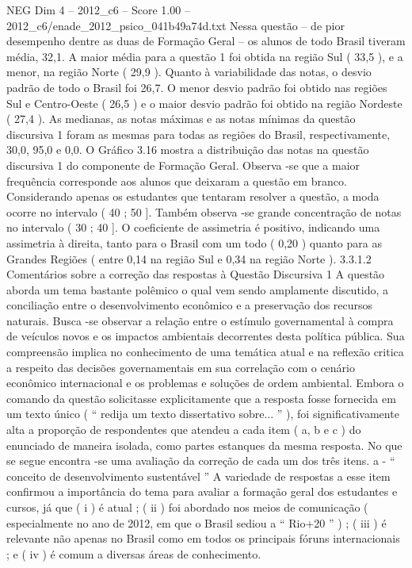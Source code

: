 \begin{textsample}{NEG Dim 4 – 2012\_c6 – Score 1.00 – 2012\_c6/enade\_2012\_psico\_041b49a74d.txt}
Nessa questão – de pior desempenho dentre as duas de Formação Geral – os alunos de todo Brasil tiveram média, 32,1.
A maior média para a questão 1 foi obtida na região Sul ( 33,5 ), e a menor, na região Norte ( 29,9 ).
Quanto à variabilidade das notas, o desvio padrão de todo o Brasil foi 26,7.
O menor desvio padrão foi obtido nas regiões Sul e Centro-Oeste ( 26,5 ) e o maior desvio padrão foi obtido na região Nordeste ( 27,4 ).
As medianas, as notas máximas e as notas mínimas da questão discursiva 1 foram as mesmas para todas as regiões do Brasil, respectivamente, 30,0, 95,0 e 0,0.
O Gráfico 3.16 mostra a distribuição das notas na questão discursiva 1 do componente de Formação Geral.
Observa -se que a maior frequência corresponde aos alunos que deixaram a questão em branco.
Considerando apenas os estudantes que tentaram resolver a questão, a moda ocorre no intervalo ( 40 ; 50 ].
Também observa -se grande concentração de notas no intervalo ( 30 ; 40 ].
O coeficiente de assimetria é positivo, indicando uma assimetria à direita, tanto para o Brasil com um todo ( 0,20 ) quanto para as Grandes Regiões ( entre 0,14 na região Sul e 0,34 na região Norte ). 3.3.1.2 Comentários sobre a correção das respostas à Questão Discursiva 1 A questão aborda um tema bastante polêmico o qual vem sendo amplamente discutido, a conciliação entre o desenvolvimento econômico e a preservação dos recursos naturais.
Busca -se observar a relação entre o estímulo governamental à compra de veículos novos e os impactos ambientais decorrentes desta política pública.
Sua compreensão implica no conhecimento de uma temática atual e na reflexão critica a respeito das decisões governamentais em sua correlação com o cenário econômico internacional e os problemas e soluções de ordem ambiental.
Embora o comando da questão solicitasse explicitamente que a resposta fosse fornecida em um texto único ( “ redija um texto dissertativo sobre... ” ), foi significativamente alta a proporção de respondentes que atendeu a cada item ( a, b e c ) do enunciado de maneira isolada, como partes estanques da mesma resposta.
No que se segue encontra -se uma avaliação da correção de cada um dos três itens. a - “ conceito de desenvolvimento sustentável ” A variedade de respostas a esse item confirmou a importância do tema para avaliar a formação geral dos estudantes e cursos, já que ( i ) é atual ; ( ii ) foi abordado nos meios de comunicação ( especialmente no ano de 2012, em que o Brasil sediou a “ Rio+20 ” ) ; ( iii ) é relevante não apenas no Brasil como em todos os principais fóruns internacionais ; e ( iv ) é comum a diversas áreas de conhecimento.

\end{textsample}
